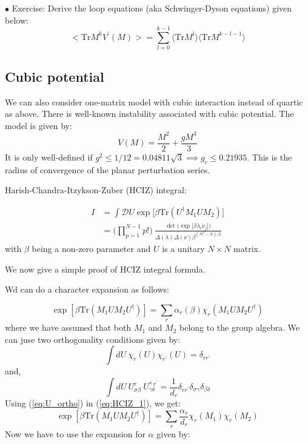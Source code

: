\documentclass[11pt]{article}
\begin{document}
\begin{mdframed}[backgroundcolor=blue!3] 
	\textsc{} 
	$\bullet$ Exercise: Derive the loop equations (aka Schwinger-Dyson equations) given below: \\ 
	\begin{equation}
		\label{eq:LE} 
		\Big< \mbox{Tr} M^{k} V^{\prime}(M) \Big> = \sum_{l=0}^{k-1} \langle \mbox{Tr} M^{l} \rangle  \langle \mbox{Tr} M^{k-l-1} \rangle
		\nonumber
	\end{equation} 
\end{mdframed} 

\subsection{Cubic potential}

We can also consider one-matrix model with cubic interaction instead of quartic as above. There is well-known instability associated with cubic potential. The model is given by:
\begin{equation}
	V(M) = \frac{M^2}{2} + \frac{gM^3}{3}  
\end{equation}
It is only well-defined if $ g^2 \le 1/12 = 0.04811 \sqrt{3} \implies g_{c} \le 0.21935$. This is the radius of convergence of the planar perturbation series. 


Harish-Chandra-Itzykson-Zuber (HCIZ) integral:

\begin{align}
	I &= \int \mathcal{D}U \exp \Big[ \beta \mbox{Tr} (U^{\dagger}M_1 U M_2)\Big] \\ 
	& =  \Bigg(\prod_{p=1}^{N-1} p! \Bigg) ~ \frac{\det \Big(\exp \Big[\beta \lambda_{i} \nu_{j}\Big]\Big)}{\Delta(\lambda) \Delta(\nu) \beta^{(N^2 - N)/2}} 
\end{align}
with $\beta$ being a non-zero parameter and $U$ is a unitary $N \times N$ matrix. 


We now give a simple proof of HCIZ integral formula. 

Wd can do a character expansion as follows:

\begin{equation}
	\label{eq:HCIZ_1} 
	\exp\left[\beta \mbox{Tr} (M_{1}UM_{2}U^{\dagger})\right]  = \sum_{r} \alpha_{r}(\beta) \chi_{r}(M_{1}UM_{2}U^{\dagger})
\end{equation}
where we have assumed that both $M_1$ and $M_2$ belong to the group algebra.
We can juse two orthogonality conditions given by:
\begin{equation}
	\int dU~\chi_{r}(U) \chi_{r^{\prime}}(U) = \delta_{r r^{\prime}} 
\end{equation}
and, 
\begin{equation}
	\label{eq:U_ortho} 
	\int dU~U^{r}_{\sigma\beta} ~ U^{* ~ r^{\prime}}_{\gamma\delta} = \frac{1}{d_{r}} \delta_{r r^{\prime}} \delta_{\sigma \gamma} \delta_{\beta \delta}
\end{equation}
Using (\ref{eq:U_ortho}) in (\ref{eq:HCIZ_1}), we get:
\begin{equation}
	\exp\left[\beta \mbox{Tr} (M_{1}UM_{2}U^{\dagger})\right]  = \sum_{r} \frac{\alpha_{r}}{d_r} \chi_{r}(M_{1}) \chi_{r}(M_{2})
\end{equation}
Now we have to use the expansion for $\alpha$ given by:
\end{document}
